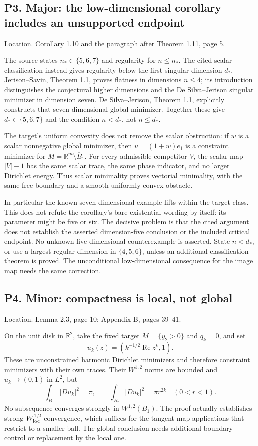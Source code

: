 \documentclass[10pt]{article}
\begin{document}
\subsection*{P3. Major: the low-dimensional corollary includes an unsupported endpoint}
Location. Corollary 1.10 and the paragraph after Theorem 1.11, page 5.\par
The source states \(n_*\in\{5,6,7\}\) and regularity for \(n\le n_*\). The cited scalar classification instead gives regularity below the first singular dimension \(d_*\). Jerison–Savin, Theorem 1.1, proves flatness in dimensions \(n\le4\); its introduction distinguishes the conjectural higher dimensions and the De Silva–Jerison singular minimizer in dimension seven. De Silva–Jerison, Theorem 1.1, explicitly constructs that seven-dimensional global minimizer. Together these give \(d_*\in\{5,6,7\}\) and the condition \(n<d_*\), not \(n\le d_*\).\par
The target’s uniform convexity does not remove the scalar obstruction: if \(w\) is a scalar nonnegative global minimizer, then \(u=(1+w)e_1\) is a constraint minimizer for \(M=\mathbb R^m\setminus\overline B_1\). For every admissible competitor \(V\), the scalar map \(|V|-1\) has the same scalar trace, the same phase indicator, and no larger Dirichlet energy. Thus scalar minimality proves vectorial minimality, with the same free boundary and a smooth uniformly convex obstacle.\par
In particular the known seven-dimensional example lifts within the target class. This does not refute the corollary’s bare existential wording by itself: its parameter might be five or six. The decisive problem is that the cited argument does not establish the asserted dimension-five conclusion or the included critical endpoint. No unknown five-dimensional counterexample is asserted. State \(n<d_*\), or use a largest regular dimension in \(\{4,5,6\}\), unless an additional classification theorem is proved. The unconditional low-dimensional consequence for the image map needs the same correction.\par
\subsection*{P4. Minor: compactness is local, not global}
Location. Lemma 2.3, page 10; Appendix B, pages 39–41.\par
On the unit disk in \(\mathbb R^2\), take the fixed target \(M=\{y_2>0\}\) and \(q_k=0\), and set \[u_k(z)=(k^{-1/2}\operatorname{Re}z^k,1).\] These are unconstrained harmonic Dirichlet minimizers and therefore constraint minimizers with their own traces. Their \(W^{1,2}\) norms are bounded and \(u_k\to(0,1)\) in \(L^2\), but \[\int_{B_1}|Du_k|^2=\pi,\qquad
 \int_{B_r}|Du_k|^2=\pi r^{2k}\quad(0<r<1).\] No subsequence converges strongly in \(W^{1,2}(B_1)\). The proof actually establishes strong \(W^{1,2}_{\rm loc}\) convergence, which suffices for the tangent-map applications that restrict to a smaller ball. The global conclusion needs additional boundary control or replacement by the local one.\par
\end{document}
